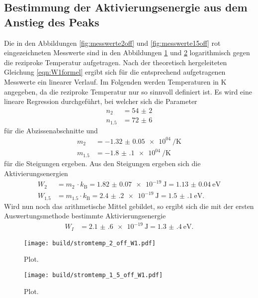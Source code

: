 \subsection{Bestimmung der Aktivierungsenergie aus dem Anstieg des Peaks}

Die in den Abbildungen \ref{fig:messwerte2off} und \ref{fig:messwerte15off} rot
eingezeichneten Messwerte sind in den Abbildungen \ref{fig:messwerte2offW1} und
\ref{fig:messwerte15offW1} logarithmisch gegen die reziproke Temperatur
aufgetragen. Nach der theoretisch hergeleiteten Gleichung \eqref{eqn:W1formel}
ergibt sich für die entsprechend aufgetragenen Messwerte ein linearer Verlauf.
Im Folgenden werden Temperaturen in $\si{\kelvin}$ angegeben, da die reziproke
Temperatur nur so sinnvoll definiert ist. Es wird eine lineare Regression durchgeführt,
bei welcher sich die Parameter
\begin{align}
  n_{2} &= \num{54(2)} \\
  n_{1.5} &= \num{72(6)}
\end{align}
für die Abzissenabschnitte und
\begin{align}
  m_{2} &= \SI{-1.32(5)e04}{\per\kelvin} \\
  m_{1.5} &= \SI{-1.8(1)e04}{\per\kelvin}
\end{align}
für die Steigungen ergeben. Aus den Steigungen ergeben sich die Aktivierungsenergien
\begin{align}
  W_{2} &= m_{2} \, \cdot k_\text{B} = \SI{1.82(7)e-19}{\joule} = \SI{1.13(4)}{\electronvolt} \\
  W_{1.5} &= m_{1.5} \cdot k_\text{B} = \SI{2.4(2)e-19}{\joule} = \SI{1.5(1)}{\electronvolt}.
\end{align}
Wird nun noch das arithmetische Mittel gebildet, so ergibt sich die mit der ersten
Auswertungsmethode bestimmte Aktivierungsenergie
\begin{align}
  W_{I} &= \SI{2.1(6)e-19}{\joule} = \SI{1.3(4)}{\electronvolt}.
\end{align}

\begin{figure}
  \centering
  \texttt{[image: build/stromtemp\_2\_off\_W1.pdf]}
  \caption{Plot.}
  \label{fig:messwerte2offW1}
\end{figure}

\begin{figure}
  \centering
  \texttt{[image: build/stromtemp\_1\_5\_off\_W1.pdf]}
  \caption{Plot.}
  \label{fig:messwerte15offW1}
\end{figure}

